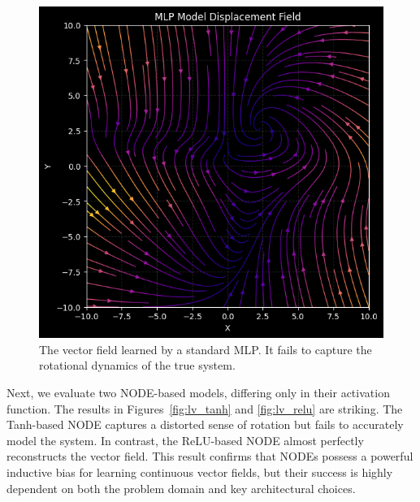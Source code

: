 \begin{figure}[h!]
  \centering
  \includegraphics[width=0.8\linewidth]{figures/lv_mlp.png}
  \caption{The vector field learned by a standard MLP. 
  It fails to capture the rotational dynamics of the true system.}
  \label{fig:lv_mlp}
\end{figure}

Next, we evaluate two NODE-based models, differing only in their activation function. 
The results in Figures~\ref{fig:lv_tanh} and \ref{fig:lv_relu} are striking. 
The Tanh-based NODE captures a distorted sense of rotation but fails to accurately model the system. 
In contrast, the ReLU-based NODE almost perfectly reconstructs the vector field. 
This result confirms that NODEs possess a powerful inductive bias for learning continuous vector 
fields, but their success is highly dependent on both the problem domain and key architectural choices.

